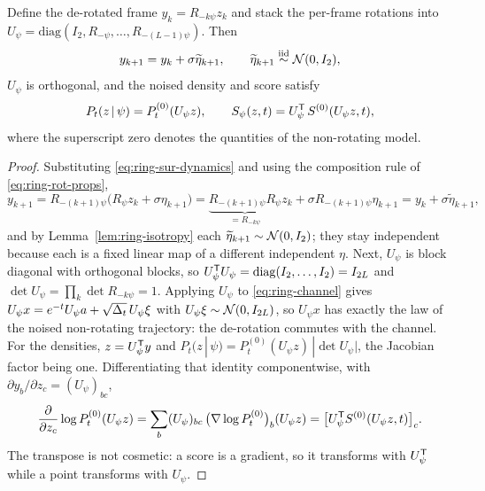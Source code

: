 \begin{lemma}\label{lem:ring-gauge}
Define the de-rotated frame $y_k = R_{-k\psi} z_k$ and stack the per-frame
rotations into
$U_\psi = \mathrm{diag}(I_2, R_{-\psi}, \dots, R_{-(L-1)\psi})$. Then
\begin{equation}
  y_{k+1} = y_k + \sigma \widetilde\eta_{k+1} ,
  \qquad \widetilde\eta_{k+1} \stackrel{\text{iid}}{\sim} \mathcal{N}(0, I_2) ,
  \label{eq:ring-gauged-rw}
\end{equation}
$U_\psi$ is orthogonal, and the noised density and score satisfy
\begin{equation}
  P_t(z \,|\, \psi) = P^{(0)}_t(U_\psi z) ,
  \qquad
  S_\psi(z,t) = U_\psi^{\mathsf{T}}\, S^{(0)}(U_\psi z, t) ,
  \label{eq:ring-gauge-score}
\end{equation}
where the superscript zero denotes the quantities of the non-rotating model.
\end{lemma}

\begin{proof}
Substituting \eqref{eq:ring-sur-dynamics} and using the composition rule of
\eqref{eq:ring-rot-props},
\begin{equation*}
  y_{k+1}
  = R_{-(k+1)\psi}\big(R_\psi z_k + \sigma\eta_{k+1}\big)
  = \underbrace{R_{-(k+1)\psi}R_\psi}_{= R_{-k\psi}} z_k
    + \sigma R_{-(k+1)\psi}\eta_{k+1}
  = y_k + \sigma\widetilde\eta_{k+1} ,
\end{equation*}
and by Lemma~\ref{lem:ring-isotropy} each
$\widetilde\eta_{k+1} \sim \mathcal{N}(0,I_2)$; they stay independent because each is a
fixed linear map of a different independent $\eta$. Next, $U_\psi$ is block
diagonal with orthogonal blocks, so
$U_\psi^{\mathsf{T}} U_\psi = \mathrm{diag}(I_2, \dots, I_2) = I_{2L}$ and
$\det U_\psi = \prod_k \det R_{-k\psi} = 1$. Applying $U_\psi$ to
\eqref{eq:ring-channel} gives
$U_\psi x = e^{-t} U_\psi a + \sqrt{\Delta_t}\, U_\psi \xi$ with
$U_\psi \xi \sim \mathcal{N}(0, I_{2L})$, so $U_\psi x$ has exactly the law of the
noised non-rotating trajectory: the de-rotation commutes with the channel. For
the densities, $z = U_\psi^{\mathsf{T}} y$ and
$P_t(z\,|\,\psi) = P^{(0)}_t(U_\psi z)\,|\det U_\psi|$, the Jacobian factor
being one. Differentiating that identity componentwise, with
$\partial y_b/\partial z_c = (U_\psi)_{bc}$,
\begin{equation*}
  \frac{\partial}{\partial z_c} \log P^{(0)}_t(U_\psi z)
  = \sum_b (U_\psi)_{bc}\,
    \big(\nabla \log P^{(0)}_t\big)_b (U_\psi z)
  = \big[ U_\psi^{\mathsf{T}} S^{(0)}(U_\psi z, t) \big]_c .
\end{equation*}
The transpose is not cosmetic: a score is a gradient, so it transforms with
$U_\psi^{\mathsf{T}}$ while a point transforms with $U_\psi$.
\end{proof}


